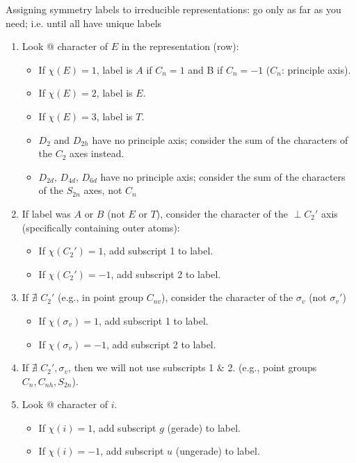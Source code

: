 \documentclass[10pt,landscape]{article}
\begin{document}
\begin{multicols}{3}
Assigning symmetry labels to irreducible representations: go only as far as you need; i.e. until all have unique labels
\begin{enumerate}
	\item Look @ character of $E$ in the representation (row):
	\begin{itemize}
		\item If $\chi(E)=1$, label is $A$ if $C_n = 1$ and B if $C_n=-1$ ($C_n$: principle axis).
		\item If $\chi(E)=2$, label is $E$. 
		\item If $\chi(E)=3$, label is $T$. 
		\item $D_2$ and $D_{2h}$ have no principle axis; consider the sum of the characters of the $C_2$ axes instead.
		\item $D_{2d}$, $D_{4d}$, $D_{6d}$ have no principle axis; consider the sum of the characters of the $S_{2n}$ axes, not $C_n$
	\end{itemize}

	\item If label was $A$ or $B$ (not $E$ or $T$), consider the character of the $\perp C_2'$ axis (specifically containing outer atoms): 
	\begin{itemize}
		\item If $\chi(C_2')=1$, add subscript 1 to label.
		\item If $\chi(C_2')=-1$, add subscript 2 to label.
	\end{itemize}

	\item If $\nexists$ $C_2'$ (e.g., in point group $C_{nv}$), consider the character of the $\sigma_v$ (not $\sigma_v'$)
	\begin{itemize}
		\item If $\chi(\sigma_v)=1$, add subscript 1 to label.
		\item If $\chi(\sigma_v)=-1$, add subscript 2 to label.
	\end{itemize}

	\item If $\nexists$ $C_2', \sigma_v$, then we will not use subscripts 1 \& 2. (e.g., point groups $C_n, C_{nh}, S_{2n}$).
	
	\item Look @ character of $i$.
	\begin{itemize}
		\item If $\chi(i)=1$, add subscript $g$ (gerade) to label.
		\item If $\chi(i)=-1$, add subscript $u$ (ungerade) to label.
	\end{itemize}


\end{enumerate}
\end{multicols}
\end{document}
